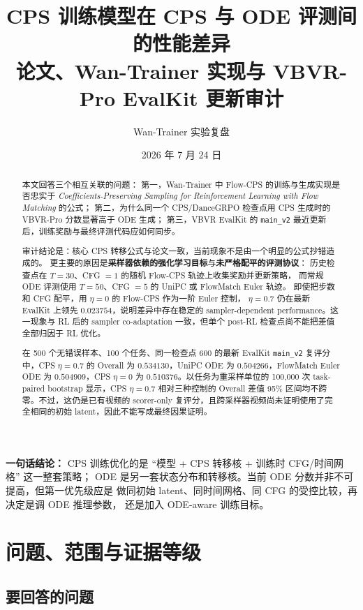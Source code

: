 \documentclass[11pt,a4paper]{article}
\title{
  \vspace{-1.2cm}
  \textbf{\LARGE CPS 训练模型在 CPS 与 ODE 评测间的性能差异}\\[0.5em]
  \Large 论文、Wan-Trainer 实现与 VBVR-Pro EvalKit 更新审计
}
\author{Wan-Trainer 实验复盘}
\date{2026 年 7 月 24 日}
\newcommand{\code}[1]{\texttt{#1}}
\newcommand{\score}[1]{\ensuremath{\mathbf{#1}}}
\newcommand{\best}[1]{\textcolor{WanGreen}{\score{#1}}}
\newcommand{\resultbox}[1]{%
  \noindent\colorbox{WanLightGreen}{%
    \parbox{\dimexpr\textwidth-2\fboxsep\relax}{\textcolor{WanGreen}{#1}}%
  }%
}
\begin{document}
\maketitle

\begin{abstract}
本文回答三个相互关联的问题：
第一，Wan-Trainer 中 Flow-CPS 的训练与生成实现是否忠实于
\emph{Coefficients-Preserving Sampling for Reinforcement Learning with Flow Matching}
的公式\cite{flowcps}；
第二，为什么同一个 CPS/DanceGRPO 检查点用 CPS 生成时的 VBVR-Pro 分数显著高于
ODE 生成；
第三，VBVR EvalKit 的 \code{main\_v2} 最近更新后，训练奖励与最终评测代码应如何同步。

审计结论是：核心 CPS 转移公式与论文一致，当前现象不是由一个明显的公式抄错造成的。
更主要的原因是\textbf{采样器依赖的强化学习目标}与\textbf{未严格配平的评测协议}：
历史检查点在 $T=30$、CFG $=1$ 的随机 Flow-CPS 轨迹上收集奖励并更新策略，
而常规 ODE 评测使用 $T=50$、CFG $=5$ 的 UniPC 或 FlowMatch Euler 轨迹。
即使把步数和 CFG 配平，用 $\eta=0$ 的 Flow-CPS 作为一阶 Euler 控制，
$\eta=0.7$ 仍在最新 EvalKit 上领先 $0.023754$，说明差异中存在稳定的
sampler-dependent performance。这一现象与 RL 后的 sampler co-adaptation
一致，但单个 post-RL 检查点尚不能把差值全部归因于 RL 优化。

在 500 个无错误样本、100 个任务、同一检查点 600 的最新 EvalKit
\code{main\_v2} 复评分中，CPS $\eta=0.7$ 的 Overall 为
\best{0.534130}，UniPC ODE 为 $0.504266$，FlowMatch Euler ODE 为
$0.504909$，CPS $\eta=0$ 为 $0.510376$。以任务为重采样单位的
100,000 次 task-paired bootstrap 显示，CPS $\eta=0.7$ 相对三种控制的
Overall 差值 95\% 区间均不跨零。不过，这仍是已有视频的 scorer-only
复评分，且跨采样器视频尚未证明使用了完全相同的初始 latent，因此不能写成最终因果证明。
\end{abstract}

\resultbox{\textbf{一句话结论：}
CPS 训练优化的是 ``模型 + CPS 转移核 + 训练时 CFG/时间网格'' 这一整套策略；
ODE 是另一套状态分布和转移核。当前 ODE 分数并非不可提高，但第一优先级应是
做同初始 latent、同时间网格、同 CFG 的受控比较，再决定是调 ODE 推理参数，
还是加入 ODE-aware 训练目标。}

\tableofcontents
\newpage

\section{问题、范围与证据等级}

\subsection{要回答的问题}
\end{document}
